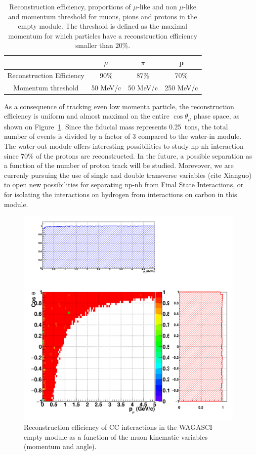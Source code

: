 \begin{table}[htb]
  \small
  \begin{center}
    \begin{tabular}{|c|c|c|c|}
      \hline
      \hline
      & $\mu$ & $\pi$ & p \\
      \hline
      Reconstruction Efficiency & 90\% & 87\% & 70\% \\
      Momentum threshold & 50 MeV/c & 50 MeV/c & 250 MeV/c  \\
      \hline
      \hline 
    \end{tabular}
    \caption{\label{tab:reconstructedparticles_empty} Reconstruction efficiency, proportions of $\mu$-like and non $\mu$-like and momentum threshold for muons, pions and protons in the empty module. The threshold is defined as the maximal momentum for which particles have a reconstruction efficiency smaller than $20\%$.}
  \end{center}
\end{table}
As a consequence of tracking even low momenta particle, the reconstruction efficiency is uniform and almost maximal on the entire $\cos \theta_{\mu}$ phase space, as shown on Figure~\ref{fig:efficiency_muonkinematics_empty}. Since the fiducial mass represents 0.25~tons, the total number of events is divided by a factor of 3 compared to the water-in module. The water-out module offers interesting possibilities to study np-nh interaction since $70\%$ of the protons are reconstructed. In the future, a possible separation as a function of the number of proton track will be studied. Morevover, we are currenly pursuing the use of single and double transverse variables (cite Xianguo) to open new possibilities for separating np-nh from Final State Interactions, or for isolating the interactions on hydrogen from interactions on carbon in this module. 

\begin{figure}
  \centering
\includegraphics[width=.7\textwidth]{fig/Efficiency_MuonKinematics_Empty.pdf}
  \caption{\label{fig:efficiency_muonkinematics_empty} Reconstruction efficiency of CC interactions in the WAGASCI empty module as a function of the muon kinematic variables (momentum and angle).}
\end{figure}
\clearpage

